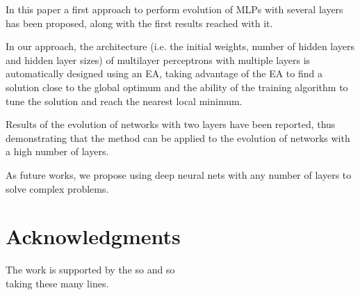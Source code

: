 \documentclass[runningheads]{llncs}
\begin{document}
In this paper a first approach to perform evolution of MLPs with
several layers has been proposed, along with the first results reached
with it.

In our approach, the architecture (i.e. the initial weights, number of
hidden layers and hidden layer sizes) of multilayer perceptrons with
multiple layers is automatically designed using an EA, taking
advantage of the EA to find a solution close to the global optimum and
the ability of the training algorithm to tune the solution and reach
the nearest local minimum.

Results of the evolution of networks with two layers have been
reported, thus demonstrating that the method can be applied to the
evolution of networks with a high number of layers.

As future works, we propose using deep neural nets with any number of
layers to solve complex problems.


\section*{Acknowledgments}

The work is
supported by the so and so \\
taking these many lines.




\end{document}
